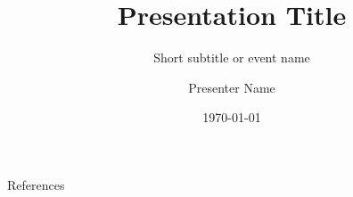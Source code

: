 \documentclass[10pt]{bamboo}
\title[]{Presentation Title}
\subtitle[]{Short subtitle or event name}
\author[]{Presenter Name}
\institute[]{Institution Name}
\date[]{\today}
\begin{document}
\begin{frame}[plain]
  \titlepage
\end{frame}





\begin{frame}[allowframebreaks]{References}
  \nocite{sample2024}
  \printbibliography
\end{frame}
\end{document}

